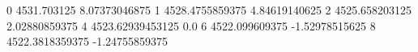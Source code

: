 0 4531.703125 8.07373046875
1 4528.4755859375 4.84619140625
2 4525.658203125 2.02880859375
4 4523.62939453125 0.0
6 4522.099609375 -1.52978515625
8 4522.3818359375 -1.24755859375
